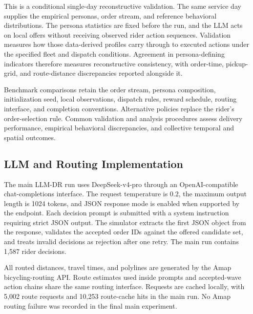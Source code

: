 \documentclass[letterpaper,journal]{IEEEtran}
\begin{document}
This is a conditional single-day reconstructive validation. The same service day supplies the empirical personas, order stream, and reference behavioral distributions. The persona statistics are fixed before the run, and the LLM acts on local offers without receiving observed rider action sequences. Validation measures how those data-derived profiles carry through to executed actions under the specified fleet and dispatch conditions. Agreement in persona-defining indicators therefore measures reconstructive consistency, with order-time, pickup-grid, and route-distance discrepancies reported alongside it.

Benchmark comparisons retain the order stream, persona composition, initialization seed, local observations, dispatch rules, reward schedule, routing interface, and completion conventions. Alternative policies replace the rider's order-selection rule. Common validation and analysis procedures assess delivery performance, empirical behavioral discrepancies, and collective temporal and spatial outcomes.

\subsection{LLM and Routing Implementation}
The main LLM-DR run uses DeepSeek-v4-pro through an OpenAI-compatible chat-completions interface. The request temperature is 0.2, the maximum output length is 1024 tokens, and JSON response mode is enabled when supported by the endpoint. Each decision prompt is submitted with a system instruction requiring strict JSON output. The simulator extracts the first JSON object from the response, validates the accepted order IDs against the offered candidate set, and treats invalid decisions as rejection after one retry. The main run contains 1,587 rider decisions.

All routed distances, travel times, and polylines are generated by the Amap bicycling-routing API. Route estimates used inside prompts and accepted-wave action chains share the same routing interface. Requests are cached locally, with 5,002 route requests and 10,253 route-cache hits in the main run. No Amap routing failure was recorded in the final main experiment.
\end{document}
